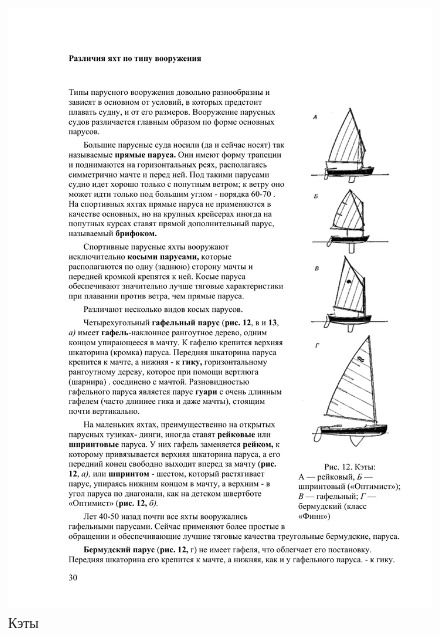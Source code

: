 \documentclass[a4paper, 12pt, twoside, final]{scrbook}
\begin{document}
\begin{figure}[htbp]
	\begin{minipage}[b]{0.49\textwidth}
		\centering\includegraphics{Kety}
		\caption{Кэты}
		\label{fig:12}
	\end{minipage}
	\hfil\hfil%
	\begin{minipage}[b]{0.49\textwidth}

\end{minipage}
\end{figure}
\end{document}
